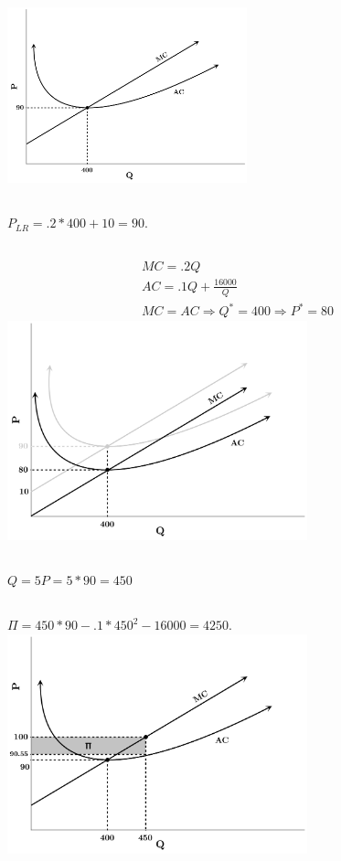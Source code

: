 \documentclass{article}
\begin{document}
	\subsection[b]{}
		\includegraphics[height=2in]{Charts/3b}
	\subsection[c]{}
		$P_{LR}=.2*400+10=90.$
	\subsection[d]{}
		\begin{align*}
			MC=.2Q\\
			AC=.1Q+\frac{16000}{Q}\\
			MC = AC \Rightarrow Q^*=400 \Rightarrow P^*=80
		\end{align*}
		\includegraphics[height=2.5in]{Charts/3d}
	\subsection[e]{}
		$Q=5P=5*90=450$
	\subsection[f]{}
		$\Pi=450*90-.1*450^2-16000=4250.$ \\
		\includegraphics[height=2.5in]{Charts/3f}
\end{document}
